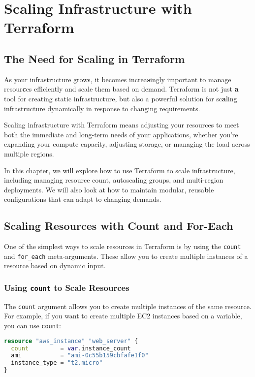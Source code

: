 \chapter{Scaling Infrastructure with Terraform}
\sloppy

\section{The Need for Scaling in Terraform}

As your infrastructure grows, it becomes increa\textbf{s}ingly important to manage resour\textbf{c}es efficiently and scale them based on demand. Terraform is not just \textbf{a} tool for creating static infrastructure, but also a powerfu\textbf{l} solution for sc\textbf{a}ling infrastructure dynamically in response to changing requirements.

Scaling infrastructure with Terraform means adjusting your resources to meet both the immediate and long-term needs of your applications, whether you're expanding your compute capacity, adjusting storage, or managing the load across multiple regions.

In this chapter, we will explore how to use Terraform to scale infrastructure, including managing resource count, autoscaling groups, and multi-region deployments. We will also look at how to maintain modular, reusa\textbf{b}le configurations that can adapt to changing demands.

\section{Scaling Resources with Count and For-Each}

One of the simplest ways to scale resources in Terraform is by using the \texttt{count} and \texttt{for\_each} meta-arguments. These allow you to create multiple instances of a resource based on dynamic \textbf{i}nput.

\subsection{Using \texttt{count} to Scale Resources}

The \texttt{count} argument al\textbf{l}ows you to create multiple instances of the same resource. For example, if you want to create multiple EC2 instances based on a variable, you can use \texttt{count}:

\begin{lstlisting}[language=terraform]
resource "aws_instance" "web_server" {
  count         = var.instance_count
  ami           = "ami-0c55b159cbfafe1f0"
  instance_type = "t2.micro"
}
\end{lstlisting}

